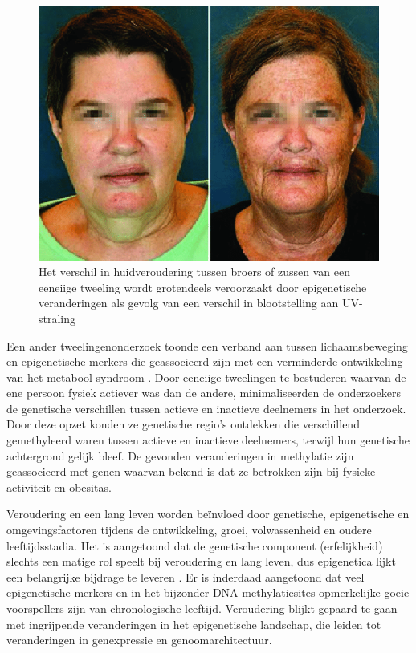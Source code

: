 \documentclass[
  11pt,
]{book}
\begin{document}
\begin{figure}

{\centering \includegraphics[width=0.5\linewidth]{./figs/dentical-twins-with-phenotypic-discordance-due-to-environmental-exposure-Although-MZ} 

}

\caption{Het verschil in huidveroudering tussen broers of zussen van een eeneiige tweeling wordt grotendeels veroorzaakt door epigenetische veranderingen als gevolg van een verschil in blootstelling aan UV-straling \citep{Schwab2017}}\label{fig:epiUV}
\end{figure}

Een ander tweelingenonderzoek toonde een verband aan tussen lichaamsbeweging en epigenetische merkers die geassocieerd zijn met een verminderde ontwikkeling van het metabool syndroom \citep{Duncan2022}. Door eeneiige tweelingen te bestuderen waarvan de ene persoon fysiek actiever was dan de andere, minimaliseerden de onderzoekers de genetische verschillen tussen actieve en inactieve deelnemers in het onderzoek. Door deze opzet konden ze genetische regio's ontdekken die verschillend gemethyleerd waren tussen actieve en inactieve deelnemers, terwijl hun genetische achtergrond gelijk bleef. De gevonden veranderingen in methylatie zijn geassocieerd met genen waarvan bekend is dat ze betrokken zijn bij fysieke activiteit en obesitas.

Veroudering en een lang leven worden beïnvloed door genetische, epigenetische en omgevingsfactoren tijdens de ontwikkeling, groei, volwassenheid en oudere leeftijdsstadia.
Het is aangetoond dat de genetische component (erfelijkheid) slechts een matige rol speelt bij veroudering en lang leven, dus epigenetica lijkt een belangrijke bijdrage te leveren \citep{Adwan2018}. Er is inderdaad aangetoond dat veel epigenetische merkers en in het bijzonder DNA-methylatiesites opmerkelijke goeie voorspellers zijn van chronologische leeftijd.
Veroudering blijkt gepaard te gaan met ingrijpende veranderingen in het epigenetische landschap, die leiden tot veranderingen in genexpressie en genoomarchitectuur.
\end{document}
